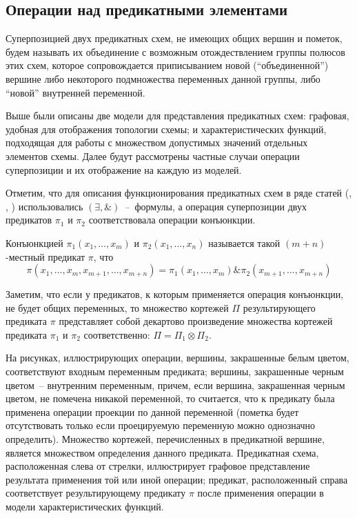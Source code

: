 \documentclass[12pt]{extarticle}
\newenvironment{definition}[1][Определение.]{\begin{trivlist}
\item[\hskip \labelsep {\bfseries #1}]}{\end{trivlist}}
\begin{document}
\subsection{Операции над предикатными элементами}

\begin{definition}
Суперпозицией двух предикатных схем, не имеющих общих вершин и пометок, 
будем называть их объединение с возможным отождествлением группы полюсов этих схем, 
которое сопровождается приписыванием новой (``объединенной'') вершине либо 
некоторого подмножества переменных данной группы, либо ``новой'' внутренней переменной.
\end{definition}

Выше были описаны две модели для представления предикатных схем: графовая, удобная для отображения топологии схемы; 
и характеристических функций, подходящая для работы с множеством допустимых значений отдельных элементов схемы. Далее 
будут рассмотрены частные случаи операции суперпозиции и их отображение на каждую из моделей.

Отметим, что для описания функционирования предикатных схем в ряде статей (\cite{Marchenkov}, \cite{Zhuk}, \cite{Shu09})
использовались $(\exists, \&)$~--~формулы, а операция суперпозиции двух предикатов $\pi_1$ и $\pi_2$ соответствовала
операции конъюнкции.

\begin{definition}
Конъюнкцией $\pi_1(x_1, \dots, x_m)$ и $\pi_2(x_1, \dots, x_n)$ называется такой $(m+n)$-местный предикат $\pi$, что
$$\pi(x_1, \dots, x_m, x_{m+1}, \dots, x_{m+n}) = \pi_1(x_1, \dots, x_m) \& \pi_2(x_{m+1}, \dots, x_{m+n})$$
\end{definition}

Заметим, что если у предикатов, к которым применяется операция конъюнкции,
не будет общих переменных, то множество кортежей $\Pi$ результирующего предиката 
$\pi$ представляет собой декартово произведение множества кортежей предиката $\pi_1$ и $\pi_2$ соответственно:
$\Pi = \Pi_1 \otimes \Pi_2$.

На рисунках, иллюстрирующих операции, вершины, закрашенные белым цветом, соответствуют входным переменным предиката; 
вершины, закрашенные черным цветом~-- внутренним переменным, причем, если вершина, закрашенная черным цветом, 
не помечена никакой переменной, то считается, что к предикату была применена операции 
проекции по данной переменной (пометка будет отсутствовать только если проецируемую переменную можно однозначно определить).
Множество кортежей, перечисленных в предикатной вершине, является множеством определения данного предиката. 
Предикатная схема, расположенная слева от стрелки, иллюстрирует графовое представление результата применения той или иной
операции; предикат, расположенный справа соответствует результирующему предикату $\pi$ после применения операции 
в модели характеристических функций.
\end{document}

